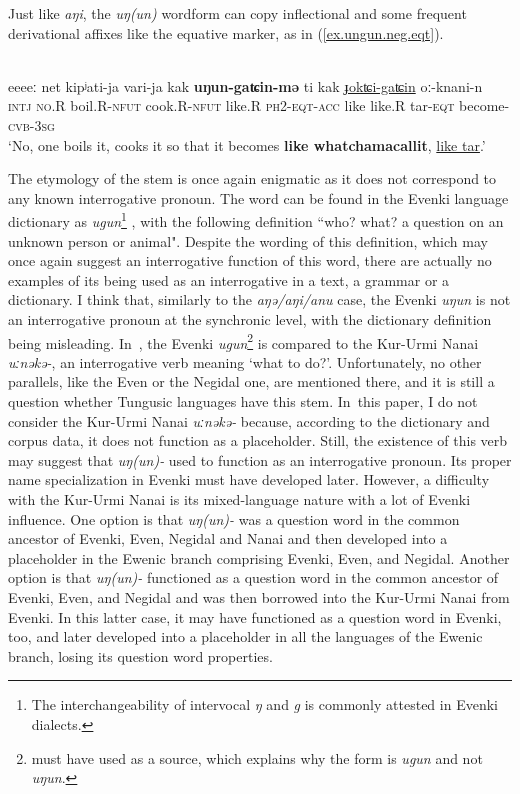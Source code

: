 \documentclass[output=paper,colorlinks,citecolor=brown
\ChapterDOI{10.5281/zenodo.15697577}
]{langscibook}
\begin{document}
Just like \textit{aŋi}, the \textit{uŋ(un)} wordform can copy inflectional and some frequent derivational affixes like the equative marker, as in (\ref{ex.ungun.neg.eqt}).

 \ea \label{ex.ungun.neg.eqt}
 \\
 \gll eeeeː net kipʲati-ja vari-ja kak \textbf{uŋun-gaʨin-mə} ti kak \uline{ɟokʨi-gaʨin} oː-knani-n\\
\textsc{intj} \textsc{no}.R boil.R-\textsc{nfut} cook.R-\textsc{nfut} like.R \textsc{ph2}-\textsc{eqt}-\textsc{acc} like like.R tar-\textsc{eqt} become-\textsc{cvb}-\textsc{3sg}\\
		\glt ‘No, one boils it, cooks it so that it becomes \textbf{like whatchamacallit}, \uline{like tar}.'
 \z
{}

The etymology of the stem is once again enigmatic as it does not correspond to any known interrogative pronoun. The word can be found in the Evenki language dictionary as \textit{ugun}\footnote{The interchangeability of intervocal \textit{ŋ} and \textit{g} is commonly attested in Evenki dialects.} \citep[625]{vasilevich1958}, with the following definition ``who? what? a question on an unknown person or animal". Despite the wording of this definition, which may once again suggest an interrogative function of this word, there are actually no examples of its being used as an interrogative in a text, a grammar or a dictionary. I think that, similarly to the \textit{aŋə/aŋi/anu} case, the Evenki \textit{uŋun} is not an interrogative pronoun at the synchronic level, with the dictionary definition being misleading. In~\citet[247]{cincius1975_1977}, the Evenki \textit{ugun}\footnote{\citet{cincius1975_1977} must have used \citet[625]{vasilevich1958} as a source, which explains why the form is \textit{ugun} and not \textit{uŋun}.} is compared to the Kur-Urmi Nanai \textit{uːnəkə-}, an interrogative verb meaning `what to do?'. Unfortunately, no other parallels, like the Even or the Negidal one, are mentioned there, and it is still a question whether Tungusic languages have this stem. In~this paper, I do not consider the Kur-Urmi Nanai \textit{uːnəkə-} because, according to the dictionary and corpus data, it does not function as a placeholder. Still, the existence of this verb may suggest that \textit{uŋ(un)-} used to function as an interrogative pronoun. Its proper name specialization in Evenki must have developed later. However, a difficulty with the Kur-Urmi Nanai is its mixed-language nature \citep[4]{Hölzl2022} with a lot of Evenki influence. One option is that \textit{uŋ(un)-} was a question word in the common ancestor of Evenki, Even, Negidal and Nanai and then developed into a placeholder in the Ewenic branch comprising Evenki, Even, and Negidal. Another option is that \textit{uŋ(un)-} functioned as a question word in the common ancestor of Evenki, Even, and Negidal and was then borrowed into the Kur-Urmi Nanai from Evenki. In this latter case, it may have functioned as a question word in Evenki, too, and later developed into a placeholder in all the languages of the Ewenic branch, losing its question word properties.
\end{document}
